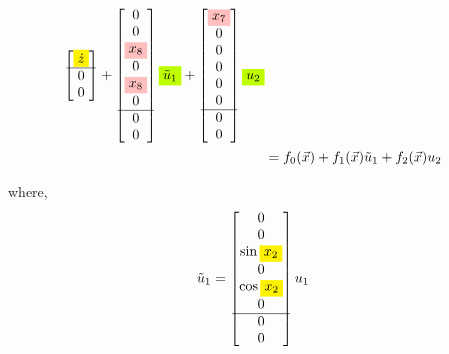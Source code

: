 \documentclass[12pt]{article}
\begin{document}
\begin{align*}
\begin{bmatrix}
        \colorbox{yellow}{$\dot{z}$} \\
        \hline
        0 \\
        0 \\
    \end{bmatrix} +  \begin{bmatrix}
        0 \\
        0 \\
        \colorbox{pink}{$x_8$} \\
        0 \\
        \colorbox{pink}{$x_8$} \\
        0 \\
        \hline
        0 \\
        0 \\
    \end{bmatrix} \colorbox{lime}{$\tilde{u}_1$} + \begin{bmatrix}
        \colorbox{pink}{$x_7$} \\
        0 \\
        0 \\
        0 \\
        0 \\
        0 \\ 
        \hline
        0 \\
        0 \\
    \end{bmatrix} \colorbox{lime}{$u_2$} \\
    &= f_0(\vec{x}) + f_1(\vec{x}) \tilde{u}_1 + f_2(\vec{x}) u_2
\end{align*}

where, 
\begin{align*}
    \tilde{u}_1 &= \begin{bmatrix}
        0 \\
        0 \\
        \sin{\colorbox{yellow}{$x_2$}} \\
        0 \\
        \cos{\colorbox{yellow}{$x_2$}} \\
        0 \\
        \hline
        0 \\
        0 \\
    \end{bmatrix} u_1
\end{align*}
\end{document}
